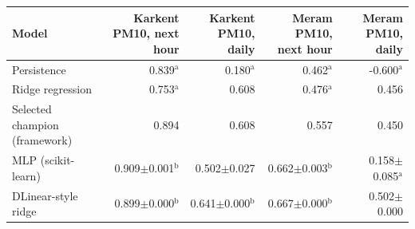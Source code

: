 \begin{tabular}{lrrrr}
\toprule
\textbf{Model} & \textbf{Karkent PM10, next hour} & \textbf{Karkent PM10, daily} & \textbf{Meram PM10, next hour} & \textbf{Meram PM10, daily} \\
\midrule
Persistence & 0.839$^{\mathrm{a}}$ & 0.180$^{\mathrm{a}}$ & 0.462$^{\mathrm{a}}$ & -0.600$^{\mathrm{a}}$ \\
Ridge regression & 0.753$^{\mathrm{a}}$ & 0.608 & 0.476$^{\mathrm{a}}$ & 0.456 \\
Selected champion (framework) & 0.894 & 0.608 & 0.557 & 0.450 \\
MLP (scikit-learn) & 0.909$\pm$0.001$^{\mathrm{b}}$ & 0.502$\pm$0.027 & 0.662$\pm$0.003$^{\mathrm{b}}$ & 0.158$\pm$0.085$^{\mathrm{a}}$ \\
DLinear-style ridge & 0.899$\pm$0.000$^{\mathrm{b}}$ & 0.641$\pm$0.000$^{\mathrm{b}}$ & 0.667$\pm$0.000$^{\mathrm{b}}$ & 0.502$\pm$0.000 \\
\bottomrule
\end{tabular}